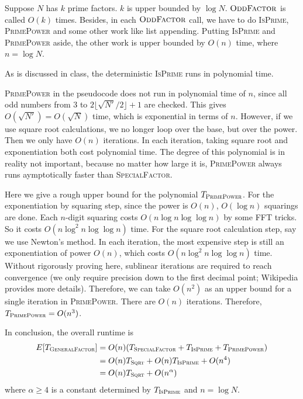 \documentclass{article}
\begin{document}
Suppose $N$ has $k$ prime factors. $k$ is upper bounded by $\log N$. $\textsc{OddFactor}$ is called $O(k)$ times. Besides, in each $\textsc{OddFactor}$ call, we have to do \textsc{IsPrime}, \textsc{PrimePower} and some other work like list appending. Putting \textsc{IsPrime} and \textsc{PrimePower} aside, the other work is upper bounded by $O(n)$ time, where $n=\log N$.

As is discussed in class, the deterministic \textsc{IsPrime} runs in polynomial time.

\textsc{PrimePower} in the pseudocode does not run in polynomial time of $n$, since all odd numbers from 3 to $2\lfloor\sqrt{N'}/2\rfloor+1$ are checked. This gives $O(\sqrt{N'})=O(\sqrt{N})$ time, which is exponential in terms of $n$. However, if we use square root calculations, we no longer loop over the base, but over the power. Then we only have $O(n)$ iterations. In each iteration, taking square root and exponentiation both cost polynomial time. The degree of this polynomial is in reality not important, because no matter how large it is, \textsc{PrimePower} always runs aymptotically faster than \textsc{SpecialFactor}.

Here we give a rough upper bound for the polynomial $T_{\textsc{PrimePower}}$. For the exponentiation by squaring step, since the power is $O(n)$, $O(\log n)$ squarings are done. Each $n$-digit squaring costs $O(n\log n\log\log n)$ by some FFT tricks. So it costs $O(n\log^2n\log\log n)$ time. For the square root calculation step, say we use Newton's method. In each iteration, the most expensive step is still an exponentiation of power $O(n)$, which costs $O(n\log^2n\log\log n)$ time. Without rigorously proving here, sublinear iterations are required to reach convergence (we only require precision down to the first decimal point; Wikipedia provides more details). Therefore, we can take $O(n^2)$ as an upper bound for a single iteration in \textsc{PrimePower}. There are $O(n)$ iterations. Therefore, $T_{\textsc{PrimePower}}=O(n^3)$.

In conclusion, the overall runtime is
\begin{align*}
E[T_{\textsc{GeneralFactor}}]&=O(n)(T_{\textsc{SpecialFactor}}+T_{\textsc{IsPrime}}+T_{\textsc{PrimePower}})\\
&=O(n)T_{\textsc{Sqrt}}+O(n)T_{\textsc{IsPrime}}+O(n^4)\\
&=O(n)T_{\textsc{Sqrt}}+O(n^\alpha)
\end{align*}
where $\alpha\geqslant4$ is a constant determined by $T_{\textsc{IsPrime}}$ and $n=\log N$.
\end{document}
